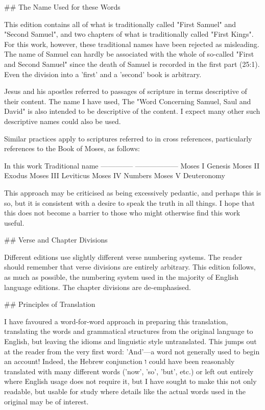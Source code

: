 ## The Name Used for these Words

This edition contains all of what is traditionally called "First Samuel"
and "Second Samuel", and two chapters of what is traditionally called
"First Kings". For this work, however, these traditional names have been
rejected as misleading. The name of Samuel can hardly be associated with
the whole of so-called "First and Second Samuel" since the death of
Samuel is recorded in the first part (25:1). Even the division into a
'first' and a 'second' book is arbitrary.

Jesus and his apostles referred to passages of scripture in terms
descriptive of their content. The name I have used, The "Word Concerning
Samuel, Saul and David" is also intended to be descriptive of the
content. I expect many other such descriptive names could also be used.

Similar practices apply to scriptures referred to in cross references,
particularly references to the Book of Moses, as follows:

  In this work   Traditional name
  -------------- ------------------
  Moses I        Genesis
  Moses II       Exodus
  Moses III      Leviticus
  Moses IV       Numbers
  Moses V        Deuteronomy

This approach may be criticised as being excessively pedantic, and
perhaps this is so, but it is consistent with a desire to speak the
truth in all things. I hope that this does not become a barrier to those
who might otherwise find this work useful.

## Verse and Chapter Divisions

Different editions use slightly different verse numbering systems. The
reader should remember that verse divisions are entirely arbitrary. This
edition follows, as much as possible, the numbering system used in the
majority of English language editions. The chapter divisions are
de-emphasised.

## Principles of Translation

I have favoured a word-for-word approach in preparing this translation,
translating the words and grammatical structures from the original
language to English, but leaving the idioms and linguistic style
untranslated. This jumps out at the reader from the very first word:
'And'---a word not generally used to begin an account! Indeed, the
Hebrew conjunction ו could have been reasonably translated with many
different words ('now', 'so', 'but', etc.) or left out entirely where
English usage does not require it, but I have sought to make this not
only readable, but usable for study where details like the actual words
used in the original may be of interest.

